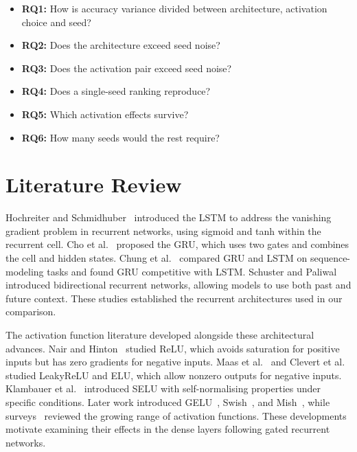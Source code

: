 \documentclass[conference,a4paper]{IEEEtran}
\begin{document}
\begin{itemize}\itemsep0pt
  \item \textbf{RQ1:} How is accuracy variance divided between
        architecture, activation choice and seed?
  \item \textbf{RQ2:} Does the architecture exceed seed noise?
  \item \textbf{RQ3:} Does the activation pair exceed seed noise?
  \item \textbf{RQ4:} Does a single-seed ranking reproduce?
  \item \textbf{RQ5:} Which activation effects survive?
  \item \textbf{RQ6:} How many seeds would the rest require?
\end{itemize}

\FloatBarrier
\section{Literature Review}

Hochreiter and Schmidhuber~\cite{hochreiter1997} introduced
the LSTM to address the vanishing gradient problem in
recurrent networks, using sigmoid and tanh within the
recurrent cell. Cho et al.~\cite{cho2014} proposed the GRU,
which uses two gates and combines the cell and hidden
states. Chung et al.~\cite{chung2014} compared GRU and LSTM
on sequence-modeling tasks and found GRU competitive with
LSTM. Schuster and Paliwal~\cite{schuster1997} introduced
bidirectional recurrent networks, allowing models to use
both past and future context. These studies established
the recurrent architectures used in our comparison.

The activation function literature developed alongside
these architectural advances. Nair and Hinton~\cite{nair2010}
studied ReLU, which avoids saturation for positive inputs
but has zero gradients for negative inputs. Maas et
al.~\cite{maas2013} and Clevert et al.~\cite{clevert2015}
studied LeakyReLU and ELU, which allow nonzero outputs for
negative inputs. Klambauer et al.~\cite{klambauer2017}
introduced SELU with self-normalising properties under
specific conditions. Later work introduced
GELU~\cite{hendrycks2016}, Swish~\cite{ramachandran2017},
and Mish~\cite{misra2020}, while
surveys~\cite{nwankpa2018,apicella2021} reviewed the growing
range of activation functions. These developments motivate
examining their effects in the dense layers following
gated recurrent networks.
\end{document}
